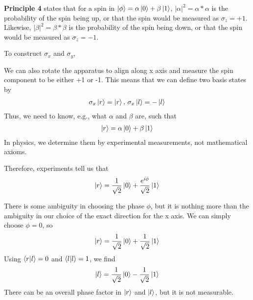 \textbf{Principle 4} states that for a spin in $ \ket{\phi}=\alpha\ket{0}+\beta\ket{1}$, $|\alpha|^2=\alpha*\alpha$ is the probability of the spin being up, or that the spin would be measured as $\sigma_z = +1$. Likewise, $|\beta|^2=\beta*\beta$ is the probability of the spin being down, or that the spin would be measured as $\sigma_z = -1$.

To construct $\sigma_x$ and $\sigma_y$, 

We can also rotate the apparatus to align along x axis and measure the spin component to be either +1 or -1. This means that we can define two basis states by
\begin{align*}
    \sigma_x\ket{r}=\ket{r}, \, \sigma_x\ket{l}=-\ket{l}
\end{align*}
Thus, we need to know, e.g., what $\alpha$ and $\beta$ are, such that
\begin{align*}
    \ket{r}=\alpha\ket{0}+\beta\ket{1}
\end{align*}
In physics, we determine them by experimental measurements, not mathematical axioms.

Therefore, experiments tell us that
\begin{align*}
    \ket{r}=\frac{1}{\sqrt{2}}\ket{0}+\frac{e^{i\phi}}{\sqrt{2}}\ket{1}
\end{align*}

There is some ambiguity in choosing the phase $\phi$, but it is nothing more than the ambiguity in our choice of the exact direction for the x axis. We can simply choose $\phi = 0$, so
\begin{align*}
    \ket{r}=\frac{1}{\sqrt{2}}\ket{0}+\frac{1}{\sqrt{2}}\ket{1}
\end{align*}
Using $\braket{r|l}=0$ and $\braket{l|l}=1$, we find
\begin{align*}
    \ket{l}=\frac{1}{\sqrt{2}}\ket{0}-\frac{1}{\sqrt{2}}\ket{1}
\end{align*}
There can be an overall phase factor in $\ket{r}$ and $\ket{l}$, but it is not measurable. 

